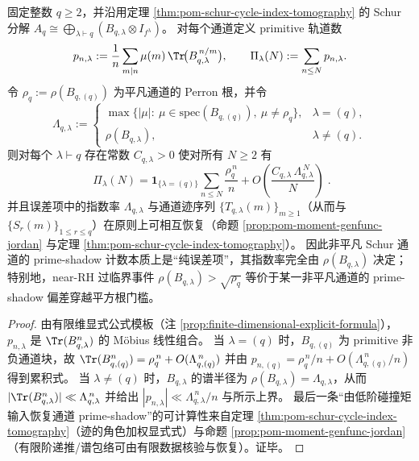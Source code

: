 






\begin{theorem}\label{thm:pom-schur-chebotarev-prime-deviation}
固定整数 \(q\ge2\)，并沿用定理 \ref{thm:pom-schur-cycle-index-tomography} 的 Schur 分解
\(
A_q\cong\bigoplus_{\lambda\vdash q}(B_{q,\lambda}\otimes I_{f^\lambda})
\)。
对每个通道定义 primitive 轨道数
\[
p_{n,\lambda}:=\frac{1}{n}\sum_{m\mid n}\mu(m)\,\Tr\!\bigl(B_{q,\lambda}^{\,n/m}\bigr),
\qquad
\Pi_\lambda(N):=\sum_{n\le N}p_{n,\lambda}.
\]
令 \(\rho_q:=\rho(B_{q,(q)})\) 为平凡通道的 Perron 根，并令
\[
\Lambda_{q,\lambda}:=
\begin{cases}
\max\{|\mu|:\ \mu\in\mathrm{spec}(B_{q,(q)}),\ \mu\neq \rho_q\}, & \lambda=(q),\\[2pt]
\rho(B_{q,\lambda}), & \lambda\neq(q).
\end{cases}
\]
则对每个 \(\lambda\vdash q\) 存在常数 \(C_{q,\lambda}>0\) 使对所有 \(N\ge2\) 有
\[
\boxed{\;
\Pi_\lambda(N)
=\mathbf 1_{\{\lambda=(q)\}}\sum_{n\le N}\frac{\rho_q^{\,n}}{n}
+O\!\left(\frac{C_{q,\lambda}\,\Lambda_{q,\lambda}^{\,N}}{N}\right)\; }.
\]
并且误差项中的指数率 \(\Lambda_{q,\lambda}\) 与通道迹序列 \(\{T_{q,\lambda}(m)\}_{m\ge1}\)（从而与 \(\{S_r(m)\}_{1\le r\le q}\)）在原则上可相互恢复（命题 \ref{prop:pom-moment-genfunc-jordan} 与定理 \ref{thm:pom-schur-cycle-index-tomography}）。
因此非平凡 Schur 通道的 prime-shadow 计数本质上是“纯误差项”，其指数率完全由 \(\rho(B_{q,\lambda})\) 决定；特别地，near-RH 过临界事件
\(
\rho(B_{q,\lambda})>\sqrt{\rho_q}
\)
等价于某一非平凡通道的 prime-shadow 偏差穿越平方根门槛。
\end{theorem}
\begin{proof}
由有限维显式公式模板（注 \ref{prop:finite-dimensional-explicit-formula}），\(p_{n,\lambda}\) 是 \(\Tr(B_{q,\lambda}^n)\) 的 Möbius 线性组合。
当 \(\lambda=(q)\) 时，\(B_{q,(q)}\) 为 primitive 非负通道块，故
\(
\Tr(B_{q,(q)}^n)=\rho_q^{\,n}+O(\Lambda_{q,(q)}^{\,n})
\)
并由 \(p_{n,(q)}=\rho_q^{\,n}/n+O(\Lambda_{q,(q)}^{\,n}/n)\) 得到累积式。
当 \(\lambda\neq(q)\) 时，\(B_{q,\lambda}\) 的谱半径为 \(\rho(B_{q,\lambda})=\Lambda_{q,\lambda}\)，从而 \(|\Tr(B_{q,\lambda}^n)|\ll \Lambda_{q,\lambda}^{\,n}\) 并给出 \(|p_{n,\lambda}|\ll \Lambda_{q,\lambda}^{\,n}/n\) 与所示上界。
最后一条“由低阶碰撞矩输入恢复通道 prime-shadow”的可计算性来自定理 \ref{thm:pom-schur-cycle-index-tomography}（迹的角色加权显式式）与命题 \ref{prop:pom-moment-genfunc-jordan}（有限阶递推/谱包络可由有限数据核验与恢复）。证毕。
\end{proof}

